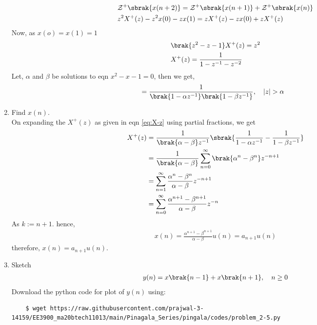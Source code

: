 \documentclass[journal,12pt,twocolumn]{IEEEtran}
\renewcommand\thesection{\arabic{section}}
\begin{document}
\begin{enumerate}[label=\thesection.\arabic*,ref=\thesection.\theenumi]
\begin{align}
	&\mathcal{Z}^+\sbrak{x(n + 2)} = \mathcal{Z}^+\sbrak{x(n + 1)} + \mathcal{Z}^+\sbrak{x(n)} \\
	&z^2X^+(z) - z^2x(0) - zx(1)  = zX^+(z) - zx(0) + zX^+(z) 
\end{align}
Now, as $x(o) = x(1) = 1$
\begin{align}
	&\brak{z^2 - z - 1}X^+(z) = z^2 \\
	&X^+(z) = \frac{1}{1 - z^{-1} - z^{-2}} 
\end{align}
Let, $\alpha$ and $\beta$ be solutions to eqn $x^2 - x - 1 = 0$,
then we get, 
\begin{align}
	&= \frac{1}{\brak{1 - \alpha z^{-1}}\brak{1 - \beta z^{-1}}}, \quad |z| > \alpha
	\label{eq:X-z}
\end{align}
\break
\item Find $x(n)$.\\
\solution On expanding the $X^+(z)$ as given in eqn \eqref{eq:X-z} using partial fractions, we get
\begin{align}
	X^+(z) &= \frac{1}{\brak{\alpha - \beta}z^{-1}}\sbrak{\frac{1}{1 - \alpha z^{-1}} - \frac{1}{1 - \beta z^{-1}}} \\
	&= \frac{1}{\brak{\alpha - \beta}}\sum_{n = 0}^{\infty}\brak{\alpha^n - \beta^n}z^{-n + 1} \\
	&= \sum_{n = 1}^{\infty}\frac{\alpha^{n} - \beta^{n}}{\alpha - \beta}z^{-n + 1} \\
	&= \sum_{n = 0}^{\infty}\frac{\alpha^{n + 1} - \beta^{n + 1}}{\alpha - \beta}z^{-n}
\end{align}
As $k := n + 1$. hence,
\begin{align}
	x(n) = \frac{\alpha^{n + 1} - \beta^{n + 1}}{\alpha - \beta}u(n) = a_{n + 1}u(n)
	\label{eq:x-n-def}
\end{align}
therefore, $x(n) = a_{n+1} u(n)$.
\item Sketch 
\begin{align}
	y(n) = x\brak{n-1} + x\brak{n+1},  \quad n \ge 0
	\label{eq:10-orig-diff-rev}
\end{align}
\solution Download the python code for plot of $y(n)$ using:
\begin{lstlisting}
	$ wget https://raw.githubusercontent.com/prajwal-3-14159/EE3900_ma20btech11013/main/Pinagala_Series/pingala/codes/problem_2-5.py
\end{lstlisting}
\begin{figure}[!ht]
	\centering

\end{figure}
\end{enumerate}
\end{document}
